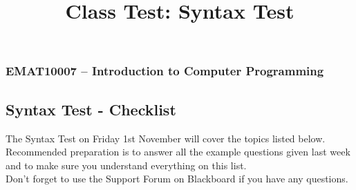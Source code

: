 \documentclass[11pt]{report}
\begin{document}
\title{Class Test: Syntax Test}
\subsubsection*{EMAT10007 -- Introduction to Computer Programming}
\subsection*{\Large Syntax Test - Checklist}

The Syntax Test on Friday 1st November will cover the topics listed below. Recommended preparation is to answer all the example questions given last week and to make sure you understand everything on this list.\\

Don't forget to use the Support Forum on Blackboard if you have any questions.
\end{document}
